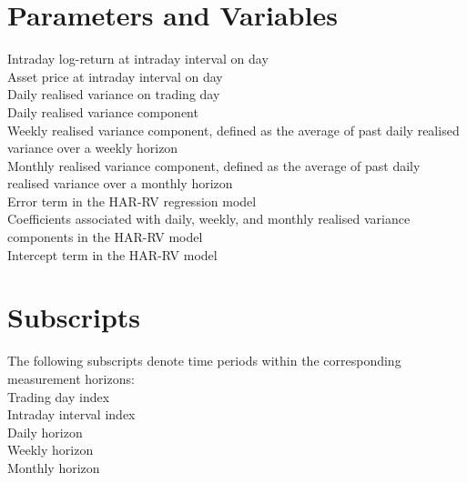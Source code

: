 \documentclass[12pt,a4paper]{report}
\begin{document}
\section{Parameters and Variables}
\noindent Intraday log-return at intraday interval on day\\
\noindent Asset price at intraday interval on day\\
\noindent Daily realised variance on trading day\\
\noindent Daily realised variance component\\
\noindent Weekly realised variance component, defined as the average of past daily realised variance over a weekly horizon\\
\noindent Monthly realised variance component, defined as the average of past daily realised variance over a monthly horizon\\
\noindent Error term in the HAR-RV regression model\\
\noindent Coefficients associated with daily, weekly, and monthly realised variance components in the HAR-RV model\\
\noindent Intercept term in the HAR-RV model\\
\section{Subscripts}
\noindent The following subscripts denote time periods within the corresponding measurement horizons:\\
\noindent Trading day index\\
\noindent Intraday interval index\\
\noindent Daily horizon\\
\noindent Weekly horizon\\
\noindent Monthly horizon\\
\end{document}
